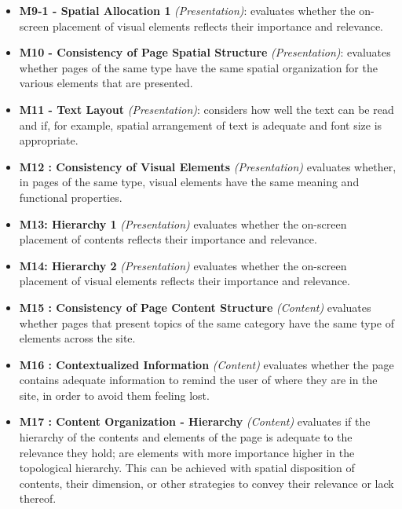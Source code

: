 \documentclass[11pt]{article} %
\begin{document}
\begin{itemize}
    \item \textbf{M9-1 - Spatial Allocation 1} \textit{(Presentation)}: evaluates whether the on-screen placement of visual elements reflects their importance and relevance.
    \item \textbf{M10 - Consistency of Page Spatial Structure} \textit{(Presentation)}: evaluates whether pages of the same type have the same spatial organization for the various elements that are presented.
    \item \textbf{M11 - Text Layout} \textit{(Presentation)}: considers how well the text can be read and if, for example, spatial arrangement of text is adequate and font size is appropriate.
    \item \textbf{M12 : Consistency of Visual Elements }\textit{(Presentation)}
	evaluates whether, in pages of the same type, visual elements have the same meaning and functional properties. 
    \item \textbf{M13: Hierarchy 1 } \textit{(Presentation)}
	evaluates whether the on-screen placement of contents reflects their importance and relevance. 
    \item \textbf{M14: Hierarchy 2 } \textit{(Presentation)}
	evaluates whether the on-screen placement of visual elements reflects their importance and relevance.
    \item \textbf{M15 : Consistency of Page Content Structure  }\textit{(Content)}
evaluates whether pages that present topics of the same category have the same type of elements across the site.
    \item \textbf{M16 : Contextualized Information } \textit{(Content)}
	evaluates whether the page contains adequate information to remind the user of where they are in the site, in order to avoid them feeling lost.
    \item \textbf{M17 : Content Organization - Hierarchy } \textit{(Content)}
	evaluates if the hierarchy of the contents and elements of the page is adequate to the relevance they hold; are elements with more importance higher in the topological hierarchy. This can be achieved with spatial disposition of contents, their dimension, or other strategies to convey their relevance or lack thereof.
\end{itemize}
\end{document}
